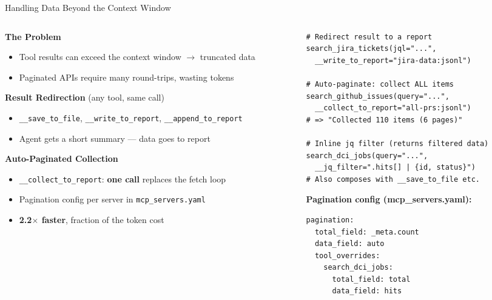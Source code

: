 \documentclass[aspectratio=169,10pt]{beamer}
\begin{document}
\begin{frame}[fragile]{Handling Data Beyond the Context Window}
\begin{columns}[T]
\begin{column}{0.45\textwidth}
\textbf{The Problem}
\begin{itemize}\scriptsize
  \item Tool results can exceed the context window $\rightarrow$ \alert{truncated data}
  \item Paginated APIs require many round-trips, wasting tokens
\end{itemize}

\smallskip
\textbf{Result Redirection} (any tool, same call)
\begin{itemize}\scriptsize
  \item \texttt{\_\_save\_to\_file}, \texttt{\_\_write\_to\_report}, \texttt{\_\_append\_to\_report}
  \item Agent gets a short summary --- data goes to report
\end{itemize}

\smallskip
\textbf{Auto-Paginated Collection}
\begin{itemize}\scriptsize
  \item \texttt{\_\_collect\_to\_report}: \textbf{one call} replaces the fetch loop
  \item Pagination config per server in \texttt{mcp\_servers.yaml}
  \item \textbf{2.2$\times$ faster}, fraction of the token cost
\end{itemize}
\end{column}
\begin{column}{0.50\textwidth}
\begin{lstlisting}[style=code,basicstyle=\ttfamily\tiny]
# Redirect result to a report
search_jira_tickets(jql="...",
  __write_to_report="jira-data:jsonl")

# Auto-paginate: collect ALL items
search_github_issues(query="...",
  __collect_to_report="all-prs:jsonl")
# => "Collected 110 items (6 pages)"

# Inline jq filter (returns filtered data)
search_dci_jobs(query="...",
  __jq_filter=".hits[] | {id, status}")
# Also composes with __save_to_file etc.
\end{lstlisting}

\smallskip
\textbf{\scriptsize Pagination config (mcp\_servers.yaml):}
\begin{lstlisting}[style=yaml,basicstyle=\ttfamily\tiny]
pagination:
  total_field: _meta.count
  data_field: auto
  tool_overrides:
    search_dci_jobs:
      total_field: total
      data_field: hits
\end{lstlisting}
\end{column}
\end{columns}
\end{frame}
\end{document}
